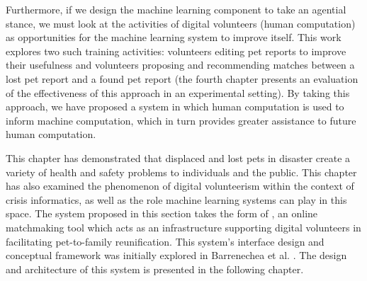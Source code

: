 Furthermore, if we design the machine learning component to take an agential stance, we must look at the activities of digital volunteers (human computation) as opportunities for the machine learning system to improve itself.  This work explores two such training activities: volunteers editing pet reports to improve their usefulness and volunteers proposing and recommending matches between a lost pet report and a found pet report (the fourth chapter presents an evaluation of the effectiveness of this approach in an experimental setting).  By taking this approach, we have proposed a system in which human computation is used to inform machine computation, which in turn provides greater assistance to future human computation.

This chapter has demonstrated that displaced and lost pets in disaster create a variety of health and safety problems to individuals and the public.  This chapter has also examined the phenomenon of digital volunteerism within the context of crisis informatics, as well as the role machine learning systems can play in this space.  The system proposed in this section takes the form of \nplh, an online matchmaking tool which acts as an infrastructure supporting digital volunteers in facilitating pet-to-family reunification.  This system's interface design and conceptual framework was initially explored in Barrenechea et al. \cite{sdc}.  The design and architecture of this system is presented in the following chapter.